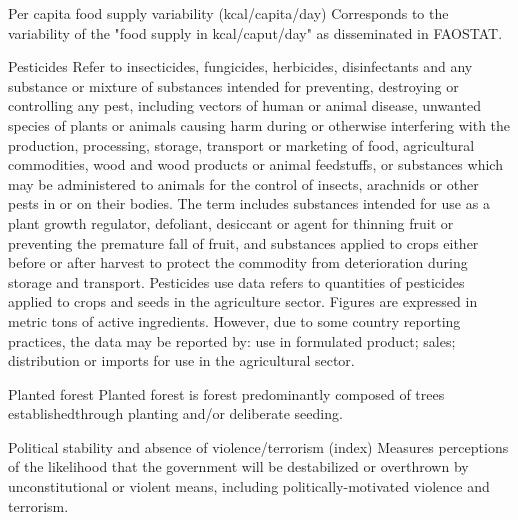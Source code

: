 \begin{MetadataCollection} {}
\begin{Energy consumption in agriculture, total} {}
\begin{metadata}{Per capita food supply variability (kcal/capita/day)} {}
Corresponds to the variability of the "food supply in kcal/caput/day" as disseminated in FAOSTAT.
\end{metadata}

\begin{metadata}{Pesticides} {}
Refer to insecticides, fungicides, herbicides, disinfectants and any substance or mixture of substances intended for preventing, destroying or controlling any pest, including vectors of human or animal disease, unwanted species of plants or animals causing harm during or otherwise interfering with the production, processing, storage, transport or marketing of food, agricultural commodities, wood and wood products or animal feedstuffs, or substances which may be administered to animals for the control of insects, arachnids or other pests in or on their bodies. The term includes substances intended for use as a plant growth regulator, defoliant, desiccant or agent for thinning fruit or preventing the premature fall of fruit, and substances applied to crops either before or after harvest to protect the commodity from deterioration during storage and transport. Pesticides use data refers to quantities of pesticides applied to crops and seeds in the agriculture sector. Figures are expressed in metric tons of active ingredients. However, due to some country reporting practices, the data may be reported by: use in formulated product; sales; distribution or imports for use in the agricultural sector. 
\end{metadata}

\begin{metadata}{Planted forest} {}
Planted forest is forest predominantly composed of trees establishedthrough planting and/or deliberate seeding.
\end{metadata}

\begin{metadata}{Political stability and absence of violence/terrorism (index)} {}
Measures perceptions of the likelihood that the government will be destabilized or overthrown by unconstitutional or violent means, including politically-motivated violence and terrorism.
\end{metadata}


\end{Energy consumption in agriculture, total}
\end{MetadataCollection}
